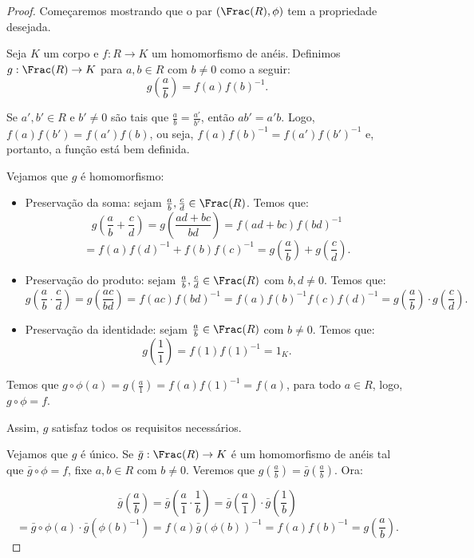 \begin{proof}
    Começaremos mostrando que o par $(\Frac(R), \phi)$ tem a propriedade desejada.

    Seja $K$ um corpo e $f:R\rightarrow K$ um homomorfismo de anéis.
    Definimos $g:\Frac(R)\rightarrow K$ para $a, b \in R$ com $b\neq 0$ como a seguir:
    \[g\left(\frac{a}{b}\right)=f(a)f(b)^{-1}.\]

    Se $a', b' \in R$ e $b'\neq 0$ são tais que $\frac{a}{b}=\frac{a'}{b'}$, então $ab'=a'b$.
    Logo, $f(a)f(b')=f(a')f(b)$, ou seja, $f(a)f(b)^{-1}=f(a')f(b')^{-1}$ e, portanto, a função está bem definida.

    Vejamos que $g$ é homomorfismo:

    \begin{itemize}
        \item Preservação da soma: sejam $\frac{a}{b}, \frac{c}{d} \in \Frac(R)$. Temos que:
        \[g\left(\frac{a}{b}+\frac{c}{d}\right)=g\left(\frac{ad+bc}{bd}\right)=f(ad+bc)f(bd)^{-1}\]
        \[=f(a)f(d)^{-1}+f(b)f(c)^{-1}=g\left(\frac{a}{b}\right)+g\left(\frac{c}{d}\right).\]
        \item Preservação do produto: sejam $\frac{a}{b}, \frac{c}{d} \in \Frac(R)$ com $b, d\neq 0$. Temos que:
        \[g\left(\frac{a}{b}\cdot\frac{c}{d}\right)=g\left(\frac{ac}{bd}\right)=f(ac)f(bd)^{-1}=f(a)f(b)^{-1}f(c)f(d)^{-1}=g\left(\frac{a}{b}\right)\cdot g\left(\frac{c}{d}\right).\]
        \item Preservação da identidade: sejam $\frac{a}{b} \in \Frac(R)$ com $b\neq 0$. Temos que:
        \[g\left(\frac{1}{1}\right)=f(1)f(1)^{-1}=1_K.\]
    \end{itemize}

    Temos que $g\circ \phi(a)=g(\frac{a}{1})=f(a)f(1)^{-1}=f(a)$, para todo $a \in R$, logo, $g\circ \phi=f$.

    Assim, $g$ satisfaz todos os requisitos necessários.

    Vejamos que $g$ é único.
    Se $\bar g:\Frac(R)\rightarrow K$ é um homomorfismo de anéis tal que $\bar g\circ \phi=f$, fixe $a, b \in R$ com $b\neq 0$. Veremos que $g\left(\frac{a}{b}\right)=\bar g\left(\frac{a}{b}\right)$.
    Ora:

    \[\bar g\left(\frac{a}{b}\right)=\bar g\left(\frac{a}{1}\cdot\frac{1}{b}\right)=\bar g\left(\frac{a}{1}\right)\cdot \bar g\left(\frac{1}{b}\right)\]
    \[=\bar g\circ \phi(a)\cdot \bar g(\phi(b)^{-1})=f(a)\bar g(\phi(b))^{-1}=f(a)f(b)^{-1}=g\left(\frac{a}{b}\right).\]


\end{proof}
